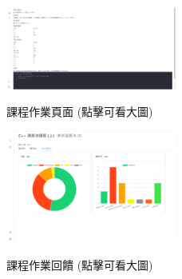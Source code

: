 \documentclass[12pt]{article}
\begin{document}
\begin{enumerate}
    \begin{figure}[H]
      \centering
      \href{https://raw.githubusercontent.com/programingtw/proglearn-plan/main/img/testcode.png}{ 
        \includegraphics[width=0.5\textwidth]{./img/testcode.png}
      }
      \caption{課程作業頁面 (點擊可看大圖)}
      \label{arc8}
    \end{figure}

    \begin{figure}[H]
      \centering
      \href{https://raw.githubusercontent.com/programingtw/proglearn-plan/main/img/feedback.png}{ 
        \includegraphics[width=0.5\textwidth]{./img/feedback.png}
      }
      \caption{課程作業回饋 (點擊可看大圖)}
      \label{arc9}
    \end{figure}
    

\end{enumerate}
\end{document}
